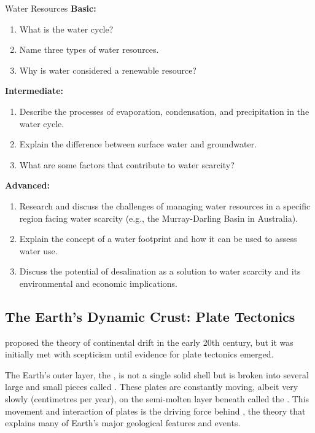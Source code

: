 \begin{tieredquestions}{Water Resources}
\textbf{Basic:}
\begin{enumerate}
    \item What is the water cycle?
    \item Name three types of water resources.
    \item Why is water considered a renewable resource?
\end{enumerate}
\textbf{Intermediate:}
\begin{enumerate}
    \item Describe the processes of evaporation, condensation, and precipitation in the water cycle.
    \item Explain the difference between surface water and groundwater.
    \item What are some factors that contribute to water scarcity?
\end{enumerate}
\textbf{Advanced:}
\begin{enumerate}
    \item Research and discuss the challenges of managing water resources in a specific region facing water scarcity (e.g., the Murray-Darling Basin in Australia).
    \item  Explain the concept of a water footprint and how it can be used to assess water use.
    \item  Discuss the potential of desalination as a solution to water scarcity and its environmental and economic implications.
\end{enumerate}
\end{tieredquestions}


\FloatBarrier

\subsection{The Earth's Dynamic Crust: Plate Tectonics}

\begin{marginnote}
 proposed the theory of continental drift in the early 20th century, but it was initially met with scepticism until evidence for plate tectonics emerged.
\end{marginnote}

The Earth's outer layer, the , is not a single solid shell but is broken into several large and small pieces called . These plates are constantly moving, albeit very slowly (centimetres per year), on the semi-molten layer beneath called the . This movement and interaction of plates is the driving force behind , the theory that explains many of Earth's major geological features and events.


